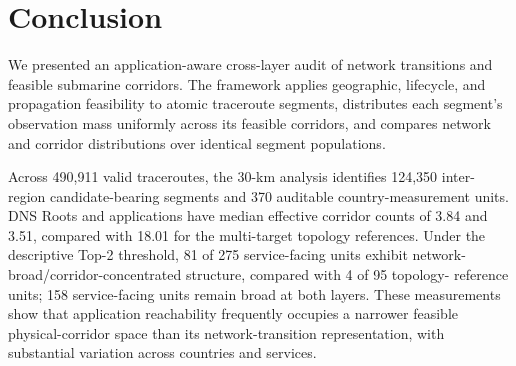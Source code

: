 \section{Conclusion}
\label{sec:conclusion}

We presented an application-aware cross-layer audit of network transitions and
feasible submarine corridors. The framework applies geographic, lifecycle,
and propagation feasibility to atomic traceroute segments, distributes each
segment's observation mass uniformly across its feasible corridors, and compares network
and corridor distributions over identical segment populations.

Across 490,911 valid traceroutes, the 30-km analysis identifies 124,350 inter-
region candidate-bearing segments and 370 auditable country-measurement
units. DNS Roots and applications have median effective corridor counts of
3.84 and 3.51, compared with 18.01 for the multi-target topology references.
Under the descriptive Top-2 threshold, 81 of 275 service-facing units exhibit
network-broad/corridor-concentrated structure, compared with 4 of 95 topology-
reference units; 158 service-facing units remain broad at both layers. These
measurements show that application reachability frequently occupies a narrower
feasible physical-corridor space than its network-transition representation,
with substantial variation across countries and services.
